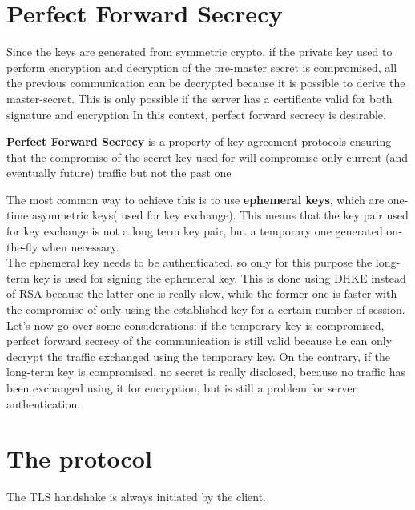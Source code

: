\section{Perfect Forward Secrecy}
Since the keys are generated from symmetric crypto, if the private key
used to perform encryption and decryption of the pre-master secret is
compromised, all the previous communication can be decrypted because
it is possible to derive the master-secret. This is only possible if
the server has a certificate valid for both signature and encryption
In this context, perfect forward secrecy is desirable.
\begin{boxH}
  \textbf{Perfect Forward Secrecy} is a property of key-agreement
  protocols ensuring that the compromise of the secret key used for 
  will compromise only current (and eventually future) traffic but not
  the past one
\end{boxH}
The most common way to achieve this is to use \textbf{ephemeral keys},
which are one-time asymmetric keys( used for key exchange). This means
that the key pair used for key exchange is not a long term key pair,
but a temporary one generated on-the-fly when necessary.\\ 
The ephemeral key needs to be authenticated, so only for this purpose
the long-term key is used for signing the ephemeral key. This is done
using DHKE instead of RSA because the latter one is really slow, while
the former one is faster with the compromise of only using the
established key for a certain number of session.\\
Let's now go over some considerations: if the temporary key is
compromised, perfect forward secrecy of the communication is still
valid because he can only decrypt the traffic exchanged using the
temporary key. On the contrary, if the long-term key is compromised,
no secret is really disclosed, because no traffic has been exchanged
using it for encryption, but is still a problem for server
authentication.

\section{The protocol}
The TLS handshake is always initiated by the client. 


